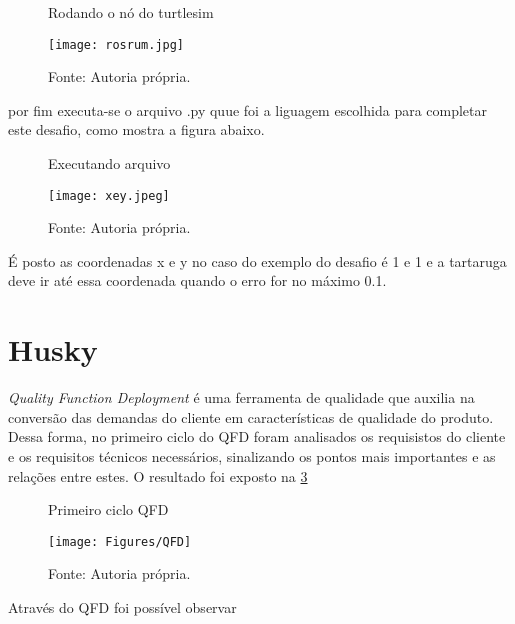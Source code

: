 \begin{figure} [h!]	
    \centering
    \caption{ Rodando o nó do turtlesim}
    \texttt{[image: rosrum.jpg]}
    \caption*{Fonte: Autoria própria.}
    \label{fig:rosrum}
\end{figure}
por fim executa-se o arquivo .py quue foi a liguagem escolhida para completar este desafio, como mostra a figura abaixo.
\begin{figure} [h!]	
    \centering
    \caption{ Executando arquivo}
    \texttt{[image: xey.jpeg]}
    \caption*{Fonte: Autoria própria.}
    \label{fig:excute.py}
\end{figure}
É posto as coordenadas x e y no caso do exemplo do desafio é 1 e 1 e a tartaruga deve ir até essa coordenada quando o erro for no máximo 0.1.
\section{Husky}
\textit{Quality Function Deployment} é uma ferramenta de qualidade que auxilia na conversão das demandas do cliente em características de qualidade do produto. Dessa forma, no primeiro ciclo do QFD foram analisados os requisistos do cliente e os requisitos técnicos necessários, sinalizando os pontos mais importantes e as relações entre estes. O resultado foi exposto na \ref{fig:QFD}

\begin{figure} [h!]	
    \centering
    \caption{ Primeiro ciclo QFD}
    \texttt{[image: Figures/QFD]}
    \caption*{Fonte: Autoria própria.}
    \label{fig:QFD}
\end{figure}
 Através do QFD foi possível observar 



